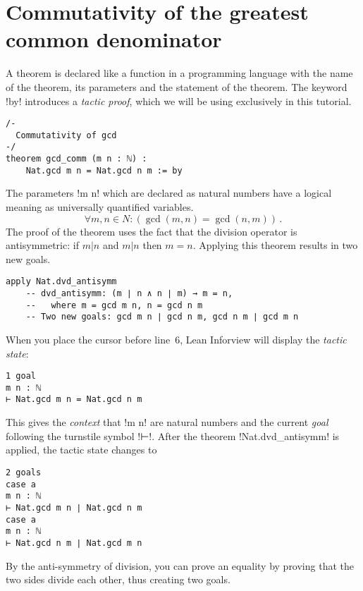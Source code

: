 
\section{Commutativity of the greatest common denominator}


A theorem is declared like a function in a programming language with the name of the theorem, its parameters and the statement of the theorem. The keyword !by! introduces a \emph{tactic proof}, which we will be using exclusively in this tutorial.
\begin{Verbatim}
/-
  Commutativity of gcd
-/
theorem gcd_comm (m n : ℕ) :
    Nat.gcd m n = Nat.gcd n m := by
\end{Verbatim}

The parameters !m n! which are declared as natural numbers have a logical meaning as universally quantified variables.
\[
\forall m, n \in N : (\gcd (m,n) = \gcd (n,m))\,.
\]
The proof of the theorem uses the fact that the division operator is antisymmetric: if $m | n$ and $m | n$ then $m=n$. Applying this theorem results in two new goals.
\begin{Verbatim}[firstnumber=last]
  apply Nat.dvd_antisymm
    -- dvd_antisymm: (m ∣ n ∧ n ∣ m) → m = n,
    --   where m = gcd m n, n = gcd n m
    -- Two new goals: gcd m n ∣ gcd n m, gcd n m ∣ gcd m n
\end{Verbatim}

When you place the cursor before line~6, Lean Inforview will display the \emph{tactic state}:
\begin{Verbatim}[numbers=none]
1 goal
m n : ℕ
⊢ Nat.gcd m n = Nat.gcd n m
\end{Verbatim}
This gives the \emph{context} that !m n! are natural numbers and the current \emph{goal} following the turnstile symbol !⊢!. After the theorem !Nat.dvd_antisymm! is applied, the tactic state changes to
\begin{Verbatim}[numbers=none]
2 goals
case a
m n : ℕ
⊢ Nat.gcd m n ∣ Nat.gcd n m
case a
m n : ℕ
⊢ Nat.gcd n m ∣ Nat.gcd m n
\end{Verbatim}
By the anti-symmetry of division, you can prove an equality by proving that the two sides divide each other, thus creating two goals.


